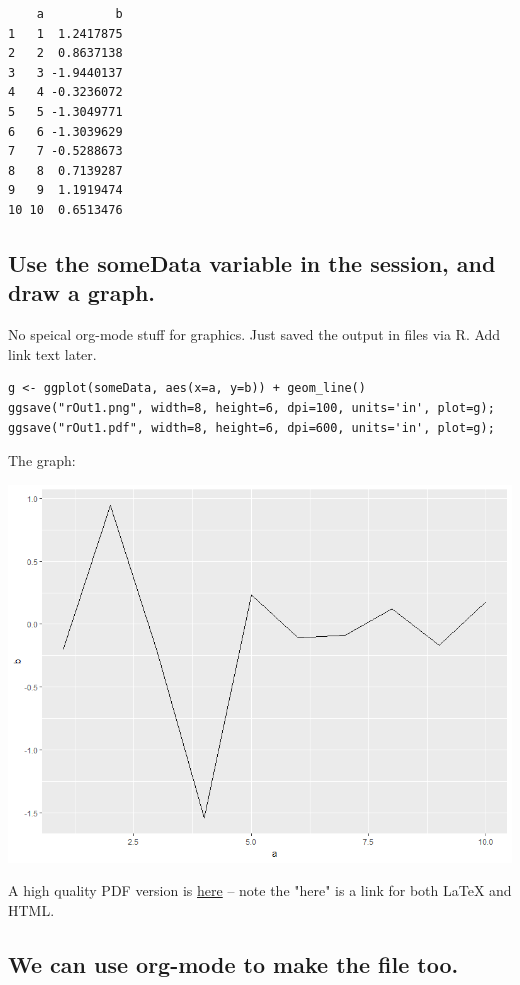 \documentclass[11pt]{article}
\begin{document}
\begin{verbatim}
    a          b
1   1  1.2417875
2   2  0.8637138
3   3 -1.9440137
4   4 -0.3236072
5   5 -1.3049771
6   6 -1.3039629
7   7 -0.5288673
8   8  0.7139287
9   9  1.1919474
10 10  0.6513476
\end{verbatim}

\subsection{Use the someData variable in the session, and draw a graph.}
\label{sec:org7ad5a7c}

No speical org-mode stuff for graphics.  Just saved the output in files via R.  Add link text later.

\begin{verbatim}
g <- ggplot(someData, aes(x=a, y=b)) + geom_line()
ggsave("rOut1.png", width=8, height=6, dpi=100, units='in', plot=g);
ggsave("rOut1.pdf", width=8, height=6, dpi=600, units='in', plot=g);
\end{verbatim}

The graph:

\begin{center}
\includegraphics[width=.9\linewidth]{rOut1.png}
\end{center}

A high quality PDF version is \href{rOut1.pdf}{here} -- note the "here" is a link for both \LaTeX{} and HTML.

\subsection{We can use org-mode to make the file too.}
\label{sec:orgcd8870c}
\end{document}
